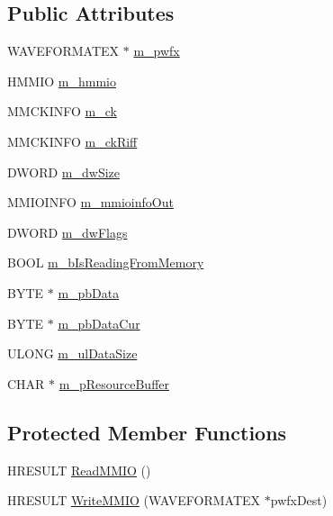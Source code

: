\subsection*{Public Attributes}
\begin{DoxyCompactItemize}
\item 
WAVEFORMATEX $\ast$ \hyperlink{class_c_wave_file_af6ddc54fd08fab871fb6dea739bde255}{m\_\-pwfx}
\item 
HMMIO \hyperlink{class_c_wave_file_aec1872e4a8671bf4ba1df0a5d730cfc9}{m\_\-hmmio}
\item 
MMCKINFO \hyperlink{class_c_wave_file_aab9779a9fa7ba2d7da6a0212b1f2c33a}{m\_\-ck}
\item 
MMCKINFO \hyperlink{class_c_wave_file_aa18dcef80431faa12e36900136117e79}{m\_\-ckRiff}
\item 
DWORD \hyperlink{class_c_wave_file_a1d9d2e7e77831165fcacebba1546fe32}{m\_\-dwSize}
\item 
MMIOINFO \hyperlink{class_c_wave_file_ae248583fb5f147af50447efdac04f308}{m\_\-mmioinfoOut}
\item 
DWORD \hyperlink{class_c_wave_file_a0d7fac94c4d49660080f9f77ad2606d2}{m\_\-dwFlags}
\item 
BOOL \hyperlink{class_c_wave_file_a0cffb36318ba8d1fa7998fbaad3369ea}{m\_\-bIsReadingFromMemory}
\item 
BYTE $\ast$ \hyperlink{class_c_wave_file_af904f348df995e199a3f2c829732382e}{m\_\-pbData}
\item 
BYTE $\ast$ \hyperlink{class_c_wave_file_a2a6915b6dc9f1a6769f7599c838aab92}{m\_\-pbDataCur}
\item 
ULONG \hyperlink{class_c_wave_file_ab6a9adffa66b801758e14431b9fa988d}{m\_\-ulDataSize}
\item 
CHAR $\ast$ \hyperlink{class_c_wave_file_afe9cccf84bd794e6f55c3e5e06f558a8}{m\_\-pResourceBuffer}
\end{DoxyCompactItemize}
\subsection*{Protected Member Functions}
\begin{DoxyCompactItemize}
\item 
HRESULT \hyperlink{class_c_wave_file_af5607e7ba6d1502735dc5bfa0da8d2b9}{ReadMMIO} ()
\item 
HRESULT \hyperlink{class_c_wave_file_aa3524cf0271959bb3f190a58b5669002}{WriteMMIO} (WAVEFORMATEX $\ast$pwfxDest)
\end{DoxyCompactItemize}


